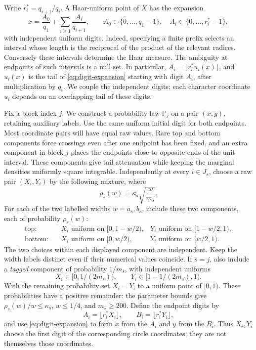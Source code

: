 Write $r_i^*=q_{i+1}/q_i$. A Haar-uniform point of $X$ has the expansion
\begin{equation}\label{eq:digit-expansion}
 x=\frac{A_0}{q_1}+\sum_{i\ge1}\frac{A_i}{q_{i+1}},
 \qquad
 A_0\in\{0,\ldots,q_1-1\},\quad
 A_i\in\{0,\ldots,r_i^*-1\},
\end{equation}
with independent uniform digits. Indeed, specifying a finite prefix selects
an interval whose length is the reciprocal of the product of the relevant
radices. Conversely these intervals determine the Haar measure. The
ambiguity at endpoints of such intervals is a null set. In particular,
$A_i=\lfloor r_i^*u_i(x)\rfloor$, and $u_i(x)$ is the tail of
\eqref{eq:digit-expansion} starting with digit $A_i$, after multiplication
by $q_i$. We couple the independent digits; each character coordinate
$u_i$ depends on an overlapping tail of these digits.

Fix a block index $j$. We construct a probability law $\mathbb P_j$ on a
pair $(x,y)$, retaining auxiliary labels. Use the same uniform initial
digit for both endpoints. Most coordinate pairs will have equal raw
values. Rare top and bottom components force crossings even after one
endpoint has been fixed, and an extra component in block $j$ places
the endpoints close to opposite ends of the unit interval. These
components give tail attenuation while keeping the marginal densities
uniformly square integrable. Independently at every $i\in J_s$, choose a
raw pair $(X_i,Y_i)$ by the following mixture, where
\[
 \rho_s(w)=\kappa_s\sqrt{\frac{w}{m_s}}.
\]
For each of the two labelled widths $w=a_s,b_s$, include these two
components, each of probability $\rho_s(w)$:
\begin{align*}
 \text{top:}\quad &X_i\text{ uniform on }[0,1-w/2),
 &Y_i\text{ uniform on }[1-w/2,1),\\
 \text{bottom:}\quad &X_i\text{ uniform on }[0,w/2),
 &Y_i\text{ uniform on }[w/2,1).
\end{align*}
The two choices within each displayed component are independent. Keep
the width labels distinct even if their numerical values coincide. If
$s=j$, also include a \emph{tagged} component of probability $1/m_s$, with
independent uniforms
\[
 X_i\in[0,1/(2m_s)),\qquad
 Y_i\in[1-1/(2m_s),1).
\]
With the remaining probability set $X_i=Y_i$ to a uniform point of
$[0,1)$. These probabilities have a positive remainder: the parameter
bounds give $\rho_s(w)/w\le\kappa_s$, $w\le1/4$, and $m_s\ge200$.
Define the endpoint digits by
\[
 A_i=\lfloor r_i^*X_i\rfloor,
 \qquad B_i=\lfloor r_i^*Y_i\rfloor,
\]
and use \eqref{eq:digit-expansion} to form $x$ from the $A_i$ and $y$
from the $B_i$. Thus $X_i,Y_i$ choose the first digit of the corresponding
circle coordinates; they are not themselves those coordinates.

